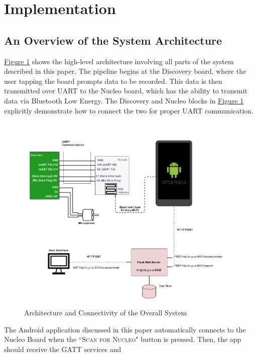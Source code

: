 \section{Implementation}

\subsection{An Overview of the System Architecture}
\hyperref[fig:arch]{Figure \ref{fig:arch}} shows the high-level architecture involving all parts of
the system described in this paper. The pipeline begins at the Discovery board, where the user
tapping the board prompts data to be recorded. This data is then transmitted over UART to the Nucleo
board, which has the ability to transmit data via Bluetooth Low Energy. The Discovery and Nucleo
blocks in \hyperref[fig:arch]{Figure \ref{fig:arch}} explicitly demonstrate how to connect the two
for proper UART communication.\\\\
\begin{figure}[h]
	\caption{Architecture and Connectivity of the Overall System}\label{fig:arch}
	\begin{center}
		\includegraphics[scale=0.6]{systemarchitecture}
	\end{center}
\end{figure}
The Android application discussed in this paper automatically connects to the Nucleo Board when the
``\textsc{Scan for Nucleo}" button is pressed. Then, the app should receive the GATT services and
